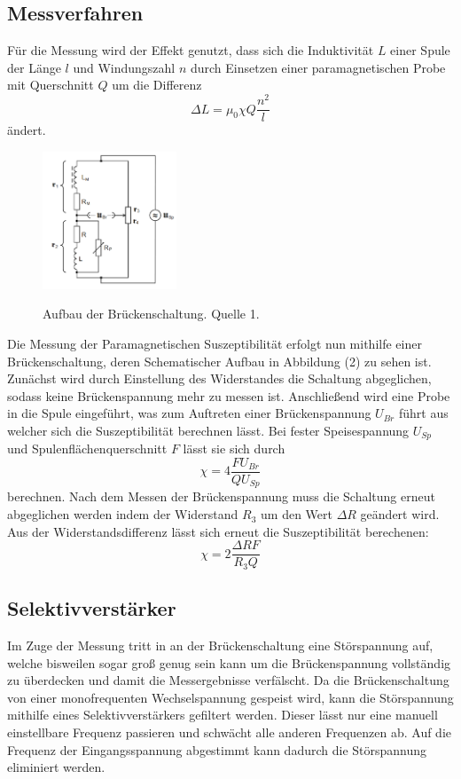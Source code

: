 \subsection{Messverfahren}
Für die Messung wird der Effekt genutzt, dass sich die Induktivität $L$ einer Spule der Länge $l$ und Windungszahl $n$ durch Einsetzen einer paramagnetischen Probe mit Querschnitt $Q$ um die Differenz
\begin{equation*}
\Delta L=\mu_0 \chi Q \frac{n^2}{l}
\end{equation*}
ändert. 
\begin{figure}[h]
    \centering
    \includegraphics[width=4cm, keepaspectratio]{Brückenschaltung}
    \label{Brueckenschaltung}
    \caption{Aufbau der Brückenschaltung. Quelle 1.}
  \end{figure}
Die Messung der Paramagnetischen Suszeptibilität erfolgt nun mithilfe einer Brückenschaltung, deren Schematischer Aufbau in Abbildung (2) zu sehen ist. Zunächst wird durch Einstellung des Widerstandes die Schaltung  abgeglichen, sodass keine Brückenspannung mehr zu messen ist. Anschließend wird eine Probe in die Spule eingeführt, was zum Auftreten einer Brückenspannung $U_{Br}$ führt aus welcher sich die Suszeptibilität berechnen lässt. Bei fester Speisespannung $U_{Sp}$ und Spulenflächenquerschnitt $F$ lässt sie sich durch
\begin{equation}
\chi=4\frac{FU_{Br}}{QU_{Sp}}
\end{equation}
berechnen. Nach dem Messen der Brückenspannung muss die Schaltung erneut abgeglichen werden indem der Widerstand $R_3$ um den Wert $\Delta R$ geändert wird. Aus der Widerstandsdifferenz lässt sich erneut die Suszeptibilität berechenen:
\begin{equation}
\chi=2\frac{\Delta R F}{R_3 Q}
\end{equation}
\subsection{Selektivverstärker}
Im Zuge der Messung tritt in an der Brückenschaltung eine Störspannung auf, welche bisweilen sogar groß genug sein kann um die Brückenspannung vollständig zu überdecken und damit die Messergebnisse verfälscht. Da die Brückenschaltung von einer monofrequenten Wechselspannung gespeist wird, kann die Störspannung mithilfe eines Selektivverstärkers gefiltert werden. Dieser lässt nur eine manuell einstellbare Frequenz passieren und schwächt alle anderen Frequenzen ab. Auf die Frequenz der Eingangsspannung abgestimmt kann dadurch die Störspannung eliminiert werden. 
